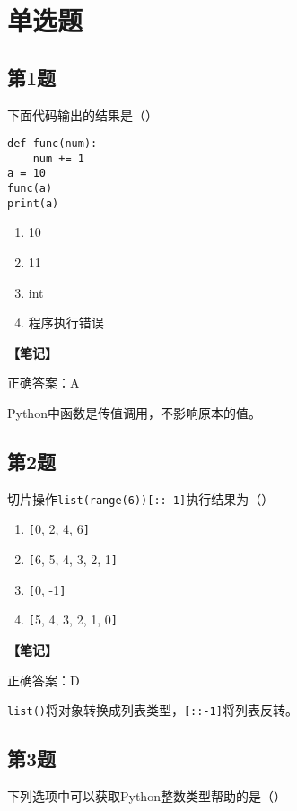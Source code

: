 \section{单选题}

\subsection{第1题}
下面代码输出的结果是（）
\begin{lstlisting}
def func(num):
    num += 1
a = 10
func(a)
print(a)
\end{lstlisting}

\begin{enumerate}[label=\Alph*.]
  \item 10
  \item 11
  \item int
  \item 程序执行错误
\end{enumerate}

\textbf{\color{red}【笔记】}

正确答案：A

Python中函数是传值调用，不影响原本的值。

\subsection{第2题}
切片操作\texttt{list(range(6))[::-1]}执行结果为（）

\begin{enumerate}[label=\Alph*.]
  \item \verb|[|0, 2, 4, 6\verb|]|
  \item \verb|[|6, 5, 4, 3, 2, 1\verb|]|
  \item \verb|[|0, -1\verb|]|
  \item \verb|[|5, 4, 3, 2, 1, 0\verb|]|
\end{enumerate}

\begin{mdframed}[linewidth=1pt, linecolor=black]

  \textbf{\color{red}【笔记】}

  正确答案：D

  \texttt{list()}将对象转换成列表类型，\texttt{[::-1]}将列表反转。

\end{mdframed}

\subsection{第3题}
下列选项中可以获取Python整数类型帮助的是（）

